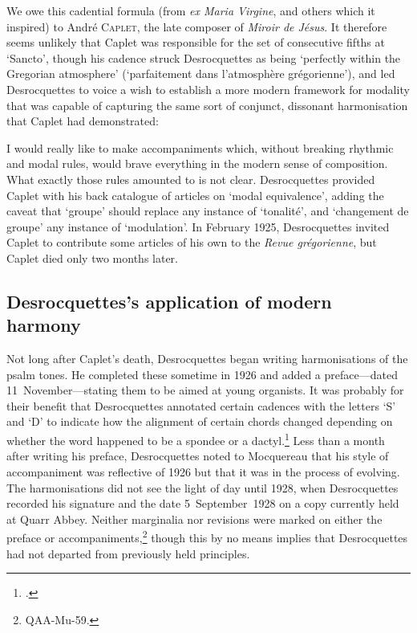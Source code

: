   {\cite[86]{DesrocquettesAccompagnementKyrialeVatican1929}}
{We owe this cadential formula (from \emph{ex Maria Virgine}, and others which it inspired) to André \textsc{Caplet}, the late composer of \emph{Miroir de Jésus}.}
\noindent
It therefore seems unlikely that Caplet was responsible for the set of consecutive fifths at `Sancto', though his cadence struck Desrocquettes as being `perfectly within the Gregorian atmosphere' (`parfaitement dans l'atmosphère grégorienne'), and led Desrocquettes to voice a wish to establish a more modern framework for modality that was capable of capturing the same sort of conjunct, dissonant harmonisation that Caplet had demonstrated:

  {}
{I would really like to make accompaniments which, without breaking rhythmic and modal rules, would brave everything in the modern sense of composition.}
\noindent
What exactly those rules amounted to is not clear.
Desrocquettes provided Caplet with his back catalogue of articles on `modal equivalence', adding the caveat that `groupe' should replace any instance of `tonalité', and `changement de groupe' any instance of `modulation'.
In February 1925, Desrocquettes invited Caplet to contribute some articles of his own to the \emph{Revue grégorienne}, but Caplet died only two months later.

\subsection{Desrocquettes's application of modern harmony}
\label{hl:bragers}%
Not long after Caplet's death, Desrocquettes began writing harmonisations of the psalm tones.
He completed these sometime in 1926 and added a preface---dated 11~November---stating them to be aimed at young organists.
It was probably for their benefit that Desrocquettes annotated certain cadences with the letters `S' and `D' to indicate how the alignment of certain chords changed depending on whether the word happened to be a spondee or a dactyl.\footcite[pp.~3, 18 and \emph{passim}]{Desrocquettesaccompagnementpsaumes1928}
Less than a month after writing his preface, Desrocquettes noted to Mocquereau that his style of accompaniment was reflective of 1926 but that it was in the process of evolving.
The harmonisations did not see the light of day until 1928, when Desrocquettes recorded his signature and the date 5~September~1928 on a copy currently held at Quarr Abbey.
Neither marginalia nor revisions were marked on either the preface or accompaniments,\footnote{\qaa{} QAA-Mu-59.} though this by no means implies that Desrocquettes had not departed from previously held principles.

